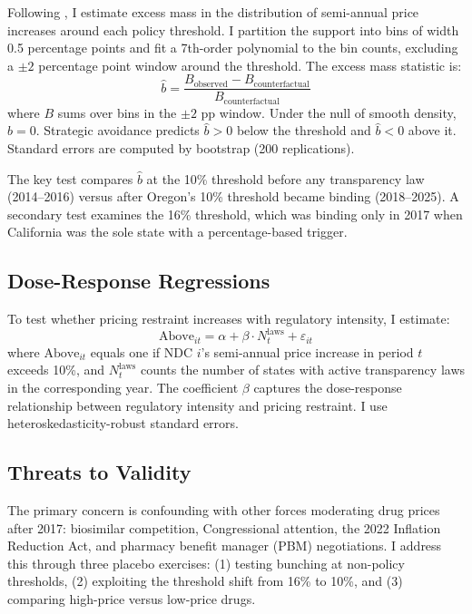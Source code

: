 \documentclass[12pt]{article}
\begin{document}
Following \citet{kleven2013}, I estimate excess mass in the distribution of semi-annual price increases around each policy threshold. I partition the support into bins of width 0.5 percentage points and fit a 7th-order polynomial to the bin counts, excluding a $\pm 2$ percentage point window around the threshold. The excess mass statistic is:
\begin{equation}
\hat{b} = \frac{B_{\text{observed}} - B_{\text{counterfactual}}}{B_{\text{counterfactual}}}
\end{equation}
where $B$ sums over bins in the $\pm 2$ pp window. Under the null of smooth density, $\hat{b} = 0$. Strategic avoidance predicts $\hat{b} > 0$ below the threshold and $\hat{b} < 0$ above it. Standard errors are computed by bootstrap (200 replications).

The key test compares $\hat{b}$ at the 10\% threshold before any transparency law (2014--2016) versus after Oregon's 10\% threshold became binding (2018--2025). A secondary test examines the 16\% threshold, which was binding only in 2017 when California was the sole state with a percentage-based trigger.

\subsection{Dose-Response Regressions}

To test whether pricing restraint increases with regulatory intensity, I estimate:
\begin{equation}
\text{Above}_{it} = \alpha + \beta \cdot N_t^{\text{laws}} + \varepsilon_{it}
\end{equation}
where $\text{Above}_{it}$ equals one if NDC $i$'s semi-annual price increase in period $t$ exceeds 10\%, and $N_t^{\text{laws}}$ counts the number of states with active transparency laws in the corresponding year. The coefficient $\beta$ captures the dose-response relationship between regulatory intensity and pricing restraint. I use heteroskedasticity-robust standard errors.

\subsection{Threats to Validity}

The primary concern is confounding with other forces moderating drug prices after 2017: biosimilar competition, Congressional attention, the 2022 Inflation Reduction Act, and pharmacy benefit manager (PBM) negotiations. I address this through three placebo exercises: (1) testing bunching at non-policy thresholds, (2) exploiting the threshold shift from 16\% to 10\%, and (3) comparing high-price versus low-price drugs.
\end{document}
